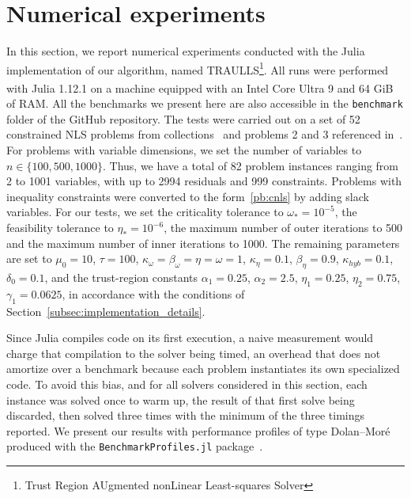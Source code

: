 \section{Numerical experiments}\label{sec:numerical_experiments}

In this section, we report numerical experiments conducted with the Julia implementation of our algorithm, named TRAULLS\footnote{Trust Region AUgmented nonLinear Least-squares Solver}. All runs were performed with Julia 1.12.1 on a machine equipped with an Intel\textsuperscript{\textregistered} Core\textsuperscript{\texttrademark} Ultra 9  and 64 GiB of RAM. All the benchmarks we present here are also accessible in the \texttt{benchmark} folder of the GitHub repository.
The tests were carried out on a set of 52 constrained NLS problems from collections~\cite{hockschittkowski:1980, schittkowski:1987, lucksanvlcek:1999} and problems 2 and 3 referenced in~\cite{biegler-etal2000}. For problems with variable dimensions, we set the number of variables to $n \in \{100, 500, 1000\}$. Thus, we have a total of 82 problem instances ranging from 2 to 1001 variables, with up to 2994 residuals and 999 constraints. Problems with inequality constraints were converted to the form~\eqref{pb:cnls} by adding slack variables. For our tests, we set the criticality tolerance to $\omega_* = 10^{-5}$, the feasibility tolerance to $\eta_* = 10^{-6}$, the maximum number of outer iterations to 500 and the maximum number of inner iterations to 1000. The remaining parameters are set to $\mu_0 = 10$, $\tau = 100$, $\kappa_\omega = \beta_\omega = \eta = \omega = 1$, $\kappa_\eta = 0.1$, $\beta_\eta = 0.9$, $\kappa_{hyb} = 0.1$, $\delta_0 = 0.1$, and the trust-region constants $\alpha_1 = 0.25$, $\alpha_2 = 2.5$, $\eta_1 = 0.25$, $\eta_2 = 0.75$, $\gamma_1 = 0.0625$, in accordance with the conditions of Section~\ref{subsec:implementation_details}.

Since Julia compiles code on its first execution, a naive measurement would charge that compilation to the solver being timed, an overhead that does not amortize over a benchmark because each problem instantiates its own specialized code. To avoid this bias, and for all solvers considered in this section, each instance was solved once to warm up, the result of that first solve being discarded, then solved three times with the minimum of the three timings reported. We present our results with performance profiles of type Dolan--Mor\'e~\cite{dolanmore:2002} produced with the \texttt{BenchmarkProfiles.jl} package~\cite{benchmark-profiles-julia}.

